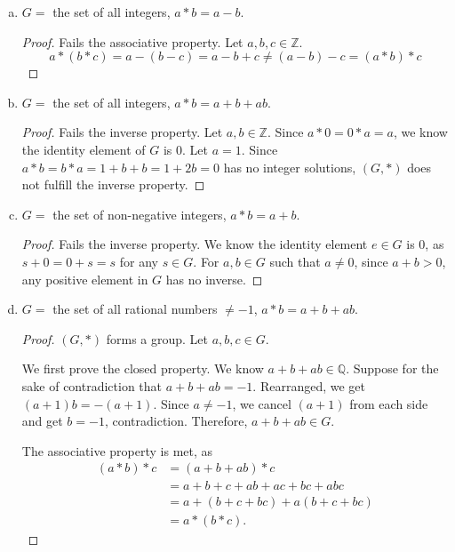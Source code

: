 \documentclass[addpoints, 11pt]{exam}
\newcommand*{\Z}{\mathbb{Z}}
\newcommand*{\Q}{\mathbb{Q}}
\begin{document}
\begin{enumerate}[(a)]
    \color{crimson}
    \item  $G = $ the set of all integers, $a * b = a - b$.
    \normalcolor
    
    \begin{proof}
        Fails the associative property. Let $a,b,c \in \Z$.
        \[
            a * (b * c) = a - (b - c) = a - b + c \neq (a - b) - c = (a * b) * c
        \]
    \end{proof}

    \color{crimson}
    \item  $G = $ the set of all integers, $a * b = a + b + ab$.
    \normalcolor
    
    \begin{proof}
        Fails the inverse property. Let $a, b \in \Z$. Since $a * 0 = 0 * a = a$, we know the identity element of $G$ is $0$. Let $a = 1$. Since $a * b = b * a = 1 + b + b = 1 + 2b = 0$ has no integer solutions, $(G, *)$ does not fulfill the inverse property.
    \end{proof}

    \color{crimson}
    \item  $G = $ the set of non-negative integers, $a * b = a + b$.
    \normalcolor
    
    \begin{proof}
        Fails the inverse property. We know the identity element $e \in G$ is $0$, as $s + 0 = 0 + s = s$ for any $s \in G$. For $a, b \in G$ such that $a \neq 0$, since $a + b > 0$, any positive element in $G$ has no inverse.
    \end{proof}

    \color{crimson}
    \item  $G = $ the set of all rational numbers $\neq -1$, $a * b = a + b + ab$.
    \normalcolor
    
    \begin{proof}
        $(G, *)$ forms a group. Let $a, b, c \in G$.

        We first prove the closed property. We know $a + b + ab \in \Q$. Suppose for the sake of contradiction that $a + b + ab = -1$. Rearranged, we get $(a + 1)b = -(a + 1)$. Since $a \neq -1$, we cancel $(a + 1)$ from each side and get $b = -1$, contradiction. Therefore, $a + b + ab \in G$.

        The associative property is met, as
        \begin{align*}
            (a * b) * c
            &= (a + b + ab) * c \\
            &= a + b + c + ab + ac + bc + abc \\
            &= a + (b + c + bc) + a(b + c + bc) \\
            &= a * (b * c).
        \end{align*}


\end{proof}
\end{enumerate}
\end{document}

